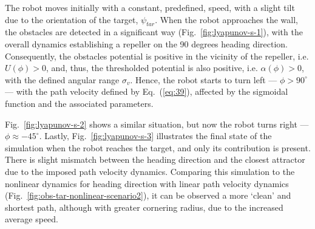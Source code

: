 %
The robot moves initially with a constant, predefined, speed, with a slight tilt
due to the orientation of the target, $\psi_{tar}$. When the robot approaches
the wall, the obstacles are
detected in a significant way (Fig.~\ref{fig:lyapunov-s-1}), with the overall
dynamics establishing a repeller on the 90 degrees heading
direction. Consequently, the obstacles potential is positive in the vicinity of
the repeller, i.e. $U(\phi) > 0$, and, thus, the thresholded potential is also
positive, i.e. $\alpha(\phi) > 0$, with the defined angular range
$\sigma_v$. Hence, the robot starts to turn left --- $\phi > 90 ^{\circ}$ ---
with the path velocity defined by Eq.~(\ref{eq:39}), affected by the sigmoidal
function and the associated parameters.

Fig.~\ref{fig:lyapunov-s-2} shows a similar situation, but now the robot turns
right --- $\phi \approx -45 ^{\circ}$. Lastly, Fig.~\ref{fig:lyapunov-s-3}
illustrates the final state of the simulation when the robot reaches the target,
and only its contribution is present. There is slight mismatch between the
heading direction and the closest attractor due to the imposed path velocity
dynamics. Comparing this simulation to the nonlinear dynamics for heading
direction with linear path velocity dynamics
(Fig.~\ref{fig:obs-tar-nonlinear-scenario2}), it can be observed a more `clean'
and shortest path, although with greater cornering radius, due to the increased
average speed.

